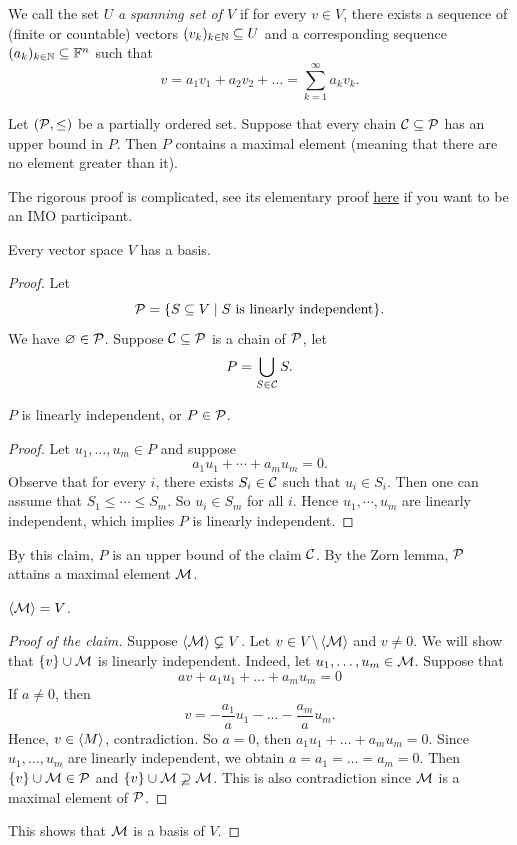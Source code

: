 We call the set $U$ \textit{a spanning set of $V$} if for every $v \in V$, there exists a sequence of (finite or countable) vectors $(v_k)_{k \in \mathbb{N}} \subseteq U$ and a corresponding sequence $(a_k)_{k \in \mathbb{N}} \subseteq \mathbb{F}^n$ such that 
\[
  v = a_1v_1 + a_2 v_2 + \dots = \sum_{k = 1}^\infty a_kv_k.
\]
\begin{lemma}

Let $(\mathcal{P},\leq)$ be a partially ordered set. Suppose that every chain
$
  \mathcal{C}\subseteq \mathcal{P}
$
has an upper bound in \(P\). Then \(P\) contains a maximal element (meaning that there are no element greater than it).
\end{lemma}
The rigorous proof is complicated, see its elementary proof \href{https://arxiv.org/pdf/2305.10258}{here} if you want to be an IMO participant. 
\begin{theorem}
Every vector space $V$ has a basis.
\end{theorem}
\begin{proof}
  Let 
  \[
    \mathcal{P} = \{S \subseteq V \mid S \text{ is linearly independent}\}.
  \]
  We have $\varnothing \in \mathcal{P}$.
  Suppose $\mathcal{C} \subseteq \mathcal{P}$ is a chain of $\mathcal{P}$, let 
  \[
    P = \bigcup_{S \in \mathcal{C}} S.
  \]
  
  \begin{claim}
      $P$  is linearly independent, or $P \in \mathcal{P}$.
  \end{claim}
  \begin{proof}
    Let $u_1,\dots, u_m \in P$ and suppose 
    \[
      a_1u_1 + \cdots + a_mu_m = 0.
    \]
    Observe that for every $i$, there exists $S_i \in \mathcal{C}$ such that $u_i \in S_i$. Then one can assume that $S_1 \leq \cdots \leq S_m$. So $u_i \in S_m$ for all $i$. Hence $u_1,\cdots, u_m$ are linearly independent, which implies $P$ is linearly independent.
  \end{proof}
  By this claim, $P$ is an upper bound of the claim $\mathcal{C}$. By the Zorn lemma, $\mathcal{P}$ attains a maximal element $\mathcal{M}$. 
  \begin{claim}
    $\left\langle \mathcal{M} \right\rangle = V$.
  \end{claim}
  \begin{proof}[Proof of the claim]
    Suppose $\left\langle \mathcal{M} \right\rangle \varsubsetneq V$. Let $v \in V \backslash \left\langle \mathcal{M} \right\rangle$ and $v \neq 0$. We will show that $\{v\} \cup \mathcal{M}$ is linearly independent. Indeed, let $u_1,\dots, u_m \in \mathcal{M}$. Suppose that 
    \[
      av + a_1u_1 + \dots + a_mu_m = 0
    \]
    If $a \neq 0$, then 
    \[
      v = -\frac{a_1}{a} u_1 - \dots - \frac{a_m}{a}u_m.
    \]
    Hence, $v \in \left\langle M \right\rangle$, contradiction. So $a = 0$, then $a_1u_1 + \dots + a_mu_m = 0$. Since $u_1,\dots, u_m$ are linearly independent, we obtain $a = a_1 = \dots = a_m = 0$. Then $\{v\} \cup \mathcal{M} \in \mathcal{P}$ and $\{v\}\cup \mathcal{M} \varsupsetneq \mathcal{M}$. This is also contradiction since $\mathcal{M}$ is a maximal element of $\mathcal{P}$.
  \end{proof}
  This shows that $\mathcal{M}$ is a basis of $V$.
\end{proof}
